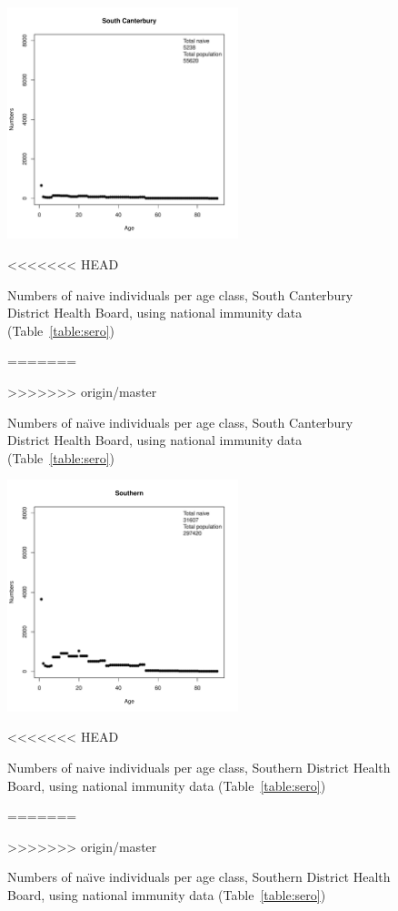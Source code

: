 \documentclass{article}
\begin{document}
\begin{itemize}
\begin{figure}[H]
     \begin{center}
     \includegraphics[width=0.6\textwidth]{dhb19.pdf}
     \end{center}
<<<<<<< HEAD
     \caption{Numbers of naive individuals per age class, South Canterbury District Health Board, using national immunity data (Table~\ref{table:sero})}
=======
     \caption{Numbers of na\"{\i}ve individuals per age class, South Canterbury District Health Board, using national immunity data (Table~\ref{table:sero})}
>>>>>>> origin/master
     \label{fig:SouthCanterbury}
\end{figure}

\begin{figure}[H]
     \begin{center}
     \includegraphics[width=0.6\textwidth]{dhb20.pdf}
     \end{center}
<<<<<<< HEAD
     \caption{Numbers of naive individuals per age class, Southern District Health Board, using national immunity data (Table~\ref{table:sero})}
=======
     \caption{Numbers of na\"{\i}ve individuals per age class, Southern District Health Board, using national immunity data (Table~\ref{table:sero})}
>>>>>>> origin/master
     \label{fig:Southern}
\end{figure}


\end{itemize}
\end{document}
